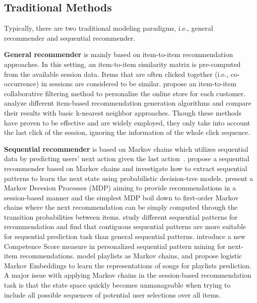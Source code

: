 \documentclass[sigconf]{acmart}
\begin{document}
\subsection{Traditional Methods}
  
Typically, there are two traditional modeling paradigms, i.e., general recommender and sequential recommender.
  
\textbf{General recommender} is mainly based on item-to-item recommendation approaches. In this setting, an item-to-item similarity matrix is pre-computed from the available session data. Items that are often clicked together (i.e., co-occurrence) in sessions are considered to be similar. \citet{linden2003amazon} propose an item-to-item collaborative filtering method to personalize the online store for each customer. \citet{sarwar2001item} analyze different item-based recommendation generation algorithms and compare their results with basic k-nearest neighbor approaches. Though these methods have proven to be effective and are widely employed, they only take into account the last click of the session, ignoring the information of the whole click sequence. 
  
\textbf{Sequential recommender} is based on Markov chains which utilizes sequential data by predicting users' next action given the last action~\cite{zimdars2001using,shani2005mdp}. \citet{zimdars2001using} propose a sequential recommender based on Markov chains and investigate how to extract sequential patterns to learn the next state using probabilistic decision-tree models. \citet{shani2005mdp} present a Markov Decesion Processes (MDP) aiming to provide recommendations in a session-based manner and the simplest MDP boil down to first-order Markov chains where the next recommendation can be simply computed through the transition probabilities between items. \citet{mobasher2002using} study different sequential patterns for recommendation and find that contiguous sequential patterns are more suitable for sequential prediction task than general sequential patterns. \citet{yap2012effective} introduce a new Competence Score measure in personalized sequential pattern mining for next-item recommendations. \citet{chen2012playlist} model playlists as Markov chains, and propose logistic Markov Embeddings to learn the representations of songs for playlists prediction. A major issue with applying Markov chains in the session-based recommendation task is that the state space quickly becomes unmanageable when trying to include all possible sequences of potential user selections over all items.
  
\end{document}
